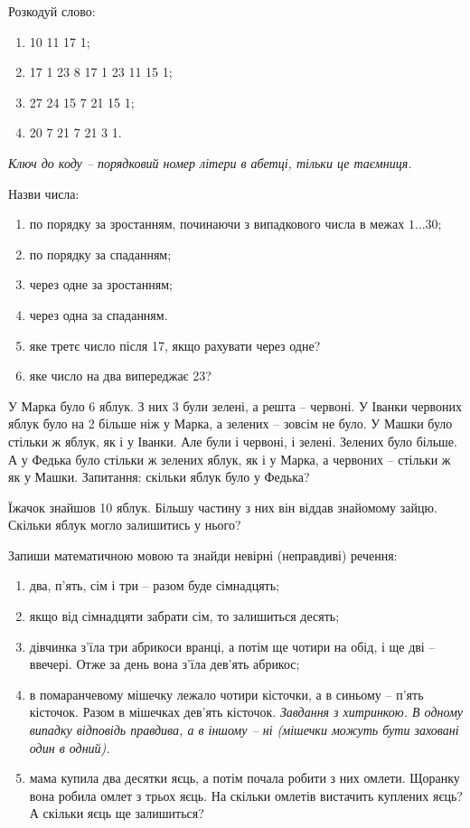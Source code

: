 \problem
Розкодуй слово:
\begin{enumerate}
    \item 10 11 17 1; 
    \item 17 1 23 8 17 1 23 11 15 1;
    \item 27 24 15 7 21 15 1;
    \item 20 7 21 7 21 3 1.
\end{enumerate}

\emph{
Ключ до коду – порядковий номер літери в абетці, тільки це таємниця.
}


\problem
Назви числа:
\begin{enumerate}
    \item по порядку за зростанням, починаючи з випадкового числа
    в межах $1\ldots30$;
    \item по порядку за спаданням;
    \item через одне за зростанням;
    \item через одна за спаданням.
    \item яке третє число після 17, якщо рахувати через одне?
    \item яке число на два випереджає 23?
\end{enumerate}


\problem
У Марка було 6 яблук. З них 3 були зелені, а решта – червоні.
У Іванки червоних яблук було на 2 більше ніж у Марка,
а зелених – зовсім не було.
У Машки було стільки ж яблук, як і у Іванки.
Але були і червоні, і зелені. Зелених було більше.
А у Федька було стільки ж зелених яблук, як і у Марка,
а червоних – стільки ж як у Машки.
Запитання: скільки яблук було у Федька?


\problem
Їжачок знайшов 10 яблук.
Більшу частину з них він віддав знайомому зайцю.
Скільки яблук могло залишитись у нього?


\problem
Запиши математичною мовою та знайди невірні (неправдиві) речення:
\begin{enumerate}
    \item два, п'ять, сім і три – разом буде сімнадцять;
    \item якщо від сімнадцяти забрати сім, то залишиться десять;
    \item дівчинка з'їла три абрикоси вранці, а потім ще чотири на обід,
    і ще дві – ввечері. Отже за день вона з'їла дев'ять абрикос;
    \item в помаранчевому мішечку лежало чотири кісточки,
    а в синьому – п'ять кісточок. Разом в мішечках дев'ять кісточок.
    \emph{Завдання з хитринкою. В одному випадку відповідь правдива,
    а в іншому – ні (мішечки можуть бути заховані один в одний).}
    \item мама купила два десятки яєць, а потім почала робити з них омлети.
    Щоранку вона робила омлет з трьох яєць.
    На скільки омлетів вистачить куплених яєць? А скільки яєць ще залишиться?
\end{enumerate}


